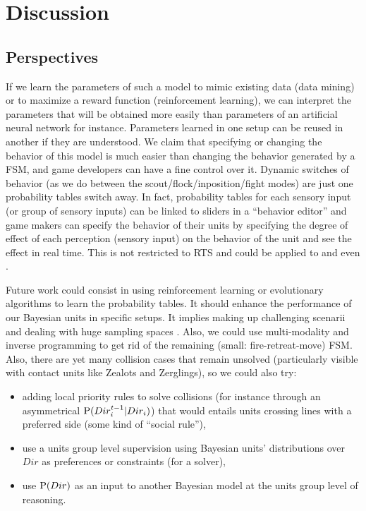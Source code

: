 \section{Discussion}

\subsection{Perspectives}
If we learn the parameters of such a model to mimic existing data (data mining) or to maximize a reward function (reinforcement learning), we can interpret the parameters that will be obtained more easily than parameters of an artificial neural network for instance. Parameters learned in one setup can be reused in another if they are understood. We claim that specifying or changing the behavior of this model is much easier than changing the behavior generated by a FSM, and game developers can have a fine control over it. Dynamic switches of behavior (as we do between the scout/flock/inposition/fight modes) are just one probability tables switch away. In fact, probability tables for each sensory input (or group of sensory inputs) can be linked to sliders in a ``behavior editor'' and game makers can specify the behavior of their units by specifying the degree of effect of each perception (sensory input) on the behavior of the unit and see the effect in real time. This is not restricted to RTS and could be applied to  and even  .


Future work could consist in using reinforcement learning \citep{Sutton} or evolutionary algorithms \citep{SmithCIG10} to learn the probability tables. It should enhance the performance of our Bayesian units in specific setups. It implies making up challenging scenarii and dealing with huge sampling spaces \citep{Asmuth09}. Also, we could use multi-modality \citep{Colas10} and inverse programming \citep{LeHy04} to get rid of the remaining (small: fire-retreat-move) FSM. Also, there are yet many collision cases that remain unsolved (particularly visible with contact units like Zealots and Zerglings), so we could also try: 
\begin{itemize}
\item adding local priority rules to solve collisions (for instance through an asymmetrical $\mathrm{P}(Dir_i^{t-1}|Dir_i)$) that would entails units crossing lines with a preferred side (some kind of ``social rule''),
\item use a units group level supervision using Bayesian units' distributions over $Dir$ as preferences or constraints (for a solver),
\item use $\mathrm{P}(Dir)$ as an input to another Bayesian model at the units group level of reasoning.
\end{itemize}

